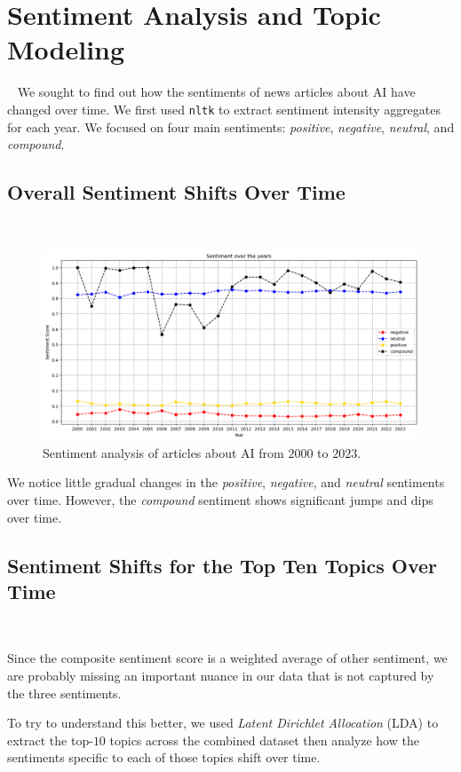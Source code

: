 \section{Sentiment Analysis and Topic Modeling}~\label{sec:sentiments}
We sought to find out how the sentiments of news articles about AI have changed over time.
We first used \verb+nltk+ to extract sentiment intensity aggregates for each year.
We focused on four main sentiments: \emph{positive}, \emph{negative}, \emph{neutral}, and \emph{compound}.

\subsection{Overall Sentiment Shifts Over Time}~\label{subsec:sentiments-overall}

\begin{figure}[H]
  \centering
  \includegraphics[width=\textwidth]{figures/sentiments/all.png}
  \caption{Sentiment analysis of articles about AI from $2000$ to $2023$.}
  \label{fig:sentiments}
\end{figure}

We notice little gradual changes in the \emph{positive}, \emph{negative}, and \emph{neutral} sentiments
over time. However, the \emph{compound} sentiment shows significant jumps and dips over time.

\subsection{Sentiment Shifts for the Top Ten Topics Over Time}~\label{subsec:sentiments-topics}

Since the composite sentiment score is a weighted average of other sentiment,
we are probably missing an important nuance in our data that is not captured by the three sentiments.

To try to understand this better, we used \emph{Latent Dirichlet Allocation} (LDA)
to extract the top-$10$ topics across the combined dataset then analyze how the sentiments
specific to each of those topics shift over time.

